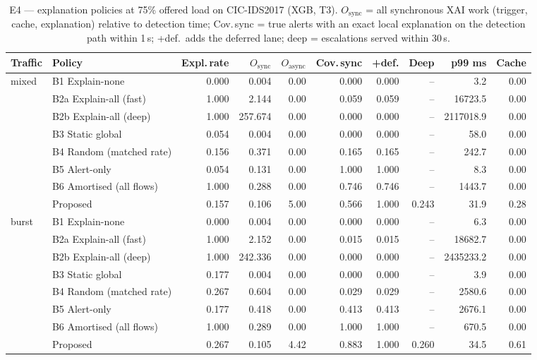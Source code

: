 \begin{table}[!htbp]
\centering
\caption{E4 --- explanation policies at 75\% offered load on CIC-IDS2017 (XGB, T3). $O_{\mathrm{sync}}$ = all synchronous XAI work (trigger, cache, explanation) relative to detection time; Cov.\,sync = true alerts with an exact local explanation on the detection path within 1\,s; +def.\ adds the deferred lane; deep = escalations served within 30\,s.}
\label{tab:stream:cic2017_XGB_T3}
\scriptsize
\setlength{\tabcolsep}{3.5pt}
\begin{tabular}{llrrrrrrrr}
\toprule
\textbf{Traffic} & \textbf{Policy} & \textbf{Expl.\,rate} & \textbf{$O_{\mathrm{sync}}$} & \textbf{$O_{\mathrm{async}}$} & \textbf{Cov.\,sync} & \textbf{+def.} & \textbf{Deep} & \textbf{p99 ms} & \textbf{Cache} \\
\midrule
mixed & B1 Explain-none & 0.000 & 0.004 & 0.00 & 0.000 & 0.000 & -- & 3.2 & 0.00 \\
 & B2a Explain-all (fast) & 1.000 & 2.144 & 0.00 & 0.059 & 0.059 & -- & 16723.5 & 0.00 \\
 & B2b Explain-all (deep) & 1.000 & 257.674 & 0.00 & 0.000 & 0.000 & -- & 2117018.9 & 0.00 \\
 & B3 Static global & 0.054 & 0.004 & 0.00 & 0.000 & 0.000 & -- & 58.0 & 0.00 \\
 & B4 Random (matched rate) & 0.156 & 0.371 & 0.00 & 0.165 & 0.165 & -- & 242.7 & 0.00 \\
 & B5 Alert-only & 0.054 & 0.131 & 0.00 & 1.000 & 1.000 & -- & 8.3 & 0.00 \\
 & B6 Amortised (all flows) & 1.000 & 0.288 & 0.00 & 0.746 & 0.746 & -- & 1443.7 & 0.00 \\
 & Proposed & 0.157 & 0.106 & 5.00 & 0.566 & 1.000 & 0.243 & 31.9 & 0.28 \\
\midrule
burst & B1 Explain-none & 0.000 & 0.004 & 0.00 & 0.000 & 0.000 & -- & 6.3 & 0.00 \\
 & B2a Explain-all (fast) & 1.000 & 2.152 & 0.00 & 0.015 & 0.015 & -- & 18682.7 & 0.00 \\
 & B2b Explain-all (deep) & 1.000 & 242.336 & 0.00 & 0.000 & 0.000 & -- & 2435233.2 & 0.00 \\
 & B3 Static global & 0.177 & 0.004 & 0.00 & 0.000 & 0.000 & -- & 3.9 & 0.00 \\
 & B4 Random (matched rate) & 0.267 & 0.604 & 0.00 & 0.029 & 0.029 & -- & 2580.6 & 0.00 \\
 & B5 Alert-only & 0.177 & 0.418 & 0.00 & 0.413 & 0.413 & -- & 2676.1 & 0.00 \\
 & B6 Amortised (all flows) & 1.000 & 0.289 & 0.00 & 1.000 & 1.000 & -- & 670.5 & 0.00 \\
 & Proposed & 0.267 & 0.105 & 4.42 & 0.883 & 1.000 & 0.260 & 34.5 & 0.61 \\
\bottomrule
\end{tabular}
\end{table}
